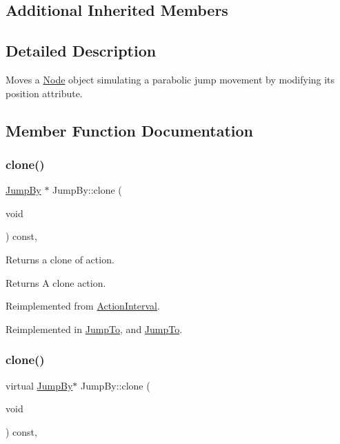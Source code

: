 \subsection*{Additional Inherited Members}


\subsection{Detailed Description}
Moves a \hyperlink{classNode}{Node} object simulating a parabolic jump movement by modifying it\textquotesingle{}s position attribute. 

\subsection{Member Function Documentation}
\mbox{\label{classJumpBy_aea740cb701f25c7648c8eb24f71f6ba3}} 
\subsubsection{\texorpdfstring{clone()}{clone()}\hspace{0.1cm}{\footnotesize\ttfamily [1/2]}}
{\footnotesize\ttfamily \hyperlink{classJumpBy}{Jump\+By} $\ast$ Jump\+By\+::clone (\begin{DoxyParamCaption}\item[{void}]{ }\end{DoxyParamCaption}) const\hspace{0.3cm}{\ttfamily [override]}, {\ttfamily [virtual]}}

Returns a clone of action.

\begin{DoxyReturn}{Returns}
A clone action. 
\end{DoxyReturn}


Reimplemented from \hyperlink{classActionInterval_abc93ce0c2f54a90eb216a7803f25f44a}{Action\+Interval}.



Reimplemented in \hyperlink{classJumpTo_aba7a2048b180db1b73224953dc42649e}{Jump\+To}, and \hyperlink{classJumpTo_a1ec85fd4b3d2190aee432923aea136c2}{Jump\+To}.

\mbox{\label{classJumpBy_a2947fd7c75a21d9ee629bc7bffdad2fa}} 
\subsubsection{\texorpdfstring{clone()}{clone()}\hspace{0.1cm}{\footnotesize\ttfamily [2/2]}}
{\footnotesize\ttfamily virtual \hyperlink{classJumpBy}{Jump\+By}$\ast$ Jump\+By\+::clone (\begin{DoxyParamCaption}\item[{void}]{ }\end{DoxyParamCaption}) const\hspace{0.3cm}{\ttfamily [override]}, {\ttfamily [virtual]}}

